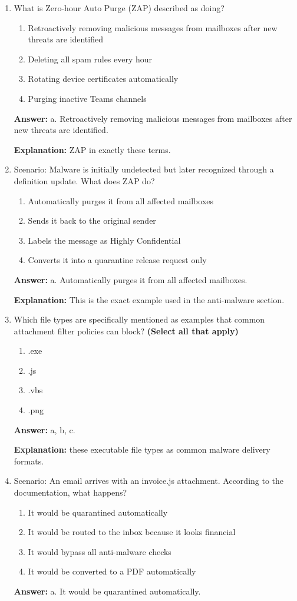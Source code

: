 \documentclass[10pt]{article}
\begin{document}
\begin{enumerate}[leftmargin=*]
\item What is Zero-hour Auto Purge (ZAP) described as doing?
\begin{enumerate}[label=\alph*., leftmargin=1.5em]
\item Retroactively removing malicious messages from mailboxes after new threats are identified
\item Deleting all spam rules every hour
\item Rotating device certificates automatically
\item Purging inactive Teams channels
\end{enumerate}
\textbf{Answer:} a. Retroactively removing malicious messages from mailboxes after new threats are identified.

\textbf{Explanation:} ZAP in exactly these terms.

\item Scenario: Malware is initially undetected but later recognized through a definition update. What does ZAP do?
\begin{enumerate}[label=\alph*., leftmargin=1.5em]
\item Automatically purges it from all affected mailboxes
\item Sends it back to the original sender
\item Labels the message as Highly Confidential
\item Converts it into a quarantine release request only
\end{enumerate}
\textbf{Answer:} a. Automatically purges it from all affected mailboxes.

\textbf{Explanation:} This is the exact example used in the anti-malware section.

\item Which file types are specifically mentioned as examples that common attachment filter policies can block? \textbf{(Select all that apply)}
\begin{enumerate}[label=\alph*., leftmargin=1.5em]
\item .exe
\item .js
\item .vbs
\item .png
\end{enumerate}
\textbf{Answer:} a, b, c.

\textbf{Explanation:} these executable file types as common malware delivery formats.

\item Scenario: An email arrives with an invoice.js attachment. According to the documentation, what happens?
\begin{enumerate}[label=\alph*., leftmargin=1.5em]
\item It would be quarantined automatically
\item It would be routed to the inbox because it looks financial
\item It would bypass all anti-malware checks
\item It would be converted to a PDF automatically
\end{enumerate}
\textbf{Answer:} a. It would be quarantined automatically.


\end{enumerate}
\end{document}
